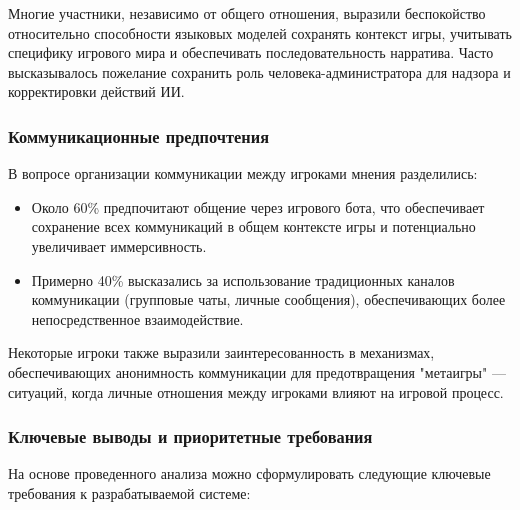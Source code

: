 Многие участники, независимо от общего отношения, выразили беспокойство относительно способности языковых моделей сохранять контекст игры, учитывать специфику игрового мира и обеспечивать последовательность нарратива. Часто высказывалось пожелание сохранить роль человека-администратора для надзора и корректировки действий ИИ.

\subsubsection{Коммуникационные предпочтения}

В вопросе организации коммуникации между игроками мнения разделились:

\begin{itemize}
    \item Около 60\% предпочитают общение через игрового бота, что обеспечивает сохранение всех коммуникаций в общем контексте игры и потенциально увеличивает иммерсивность.

    \item Примерно 40\% высказались за использование традиционных каналов коммуникации (групповые чаты, личные сообщения), обеспечивающих более непосредственное взаимодействие.
\end{itemize}

Некоторые игроки также выразили заинтересованность в механизмах, обеспечивающих анонимность коммуникации для предотвращения "метаигры" — ситуаций, когда личные отношения между игроками влияют на игровой процесс.

\subsubsection{Ключевые выводы и приоритетные требования}

На основе проведенного анализа можно сформулировать следующие ключевые требования к разрабатываемой системе:


